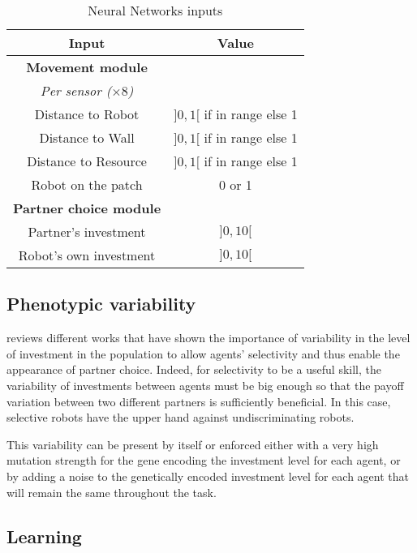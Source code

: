 \documentclass[letterpaper]{article}
\begin{document}
\begin{table}
    \centering
    \begin{tabular}{cc}
        \hline
        \textbf{Input} & \textbf{Value}  \\
        \hline
        \textbf{Movement module} & \\
        \textit{Per sensor ($\times 8$)}& \\
        Distance to Robot &  $]0, 1[$ if in range else 1 \\
        Distance to Wall & $]0, 1[$ if in range else 1  \\
        Distance to Resource & $]0, 1[$ if in range else 1  \\
        Robot on the patch & 0 or 1 \\
        \hline
        \textbf{Partner choice module} & \\
        Partner's investment & $]0, 10[$ \\
        Robot's own investment & $]0, 10[$ \\
        \hline
    \end{tabular}
    \caption{Neural Networks inputs}
    \label{tab:ann_params}
\end{table}

\subsection{Phenotypic variability} \label{sec:phenovar}

\citet{McNamara2010c} reviews different works that have shown the importance of variability in the level of investment in the population to allow agents' selectivity and thus enable the appearance of partner choice. Indeed, for selectivity to be a useful skill, the variability of investments between agents must be big enough so that the payoff variation between two different partners is sufficiently beneficial. In this case, selective robots have the upper hand against undiscriminating robots.

This variability can be present by itself or enforced either with a very high mutation strength for the gene encoding the investment level for each agent, or by adding a noise to the genetically encoded investment level for each agent that will remain the same throughout the task. 

\subsection{Learning}
\end{document}
